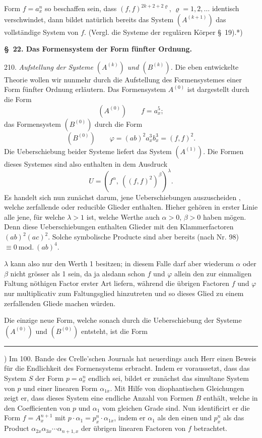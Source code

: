 Form $f = a_x^n$ so beschaffen sein, dass $(f,f)^{2k+2+2\varrho}$, $\varrho = 1, 2, \ldots$
identisch verschwindet, dann bildet natürlich bereits das System
$(A^{(k+1)})$ das vollständige System von $f$. (Vergl. die Systeme der
regulären Körper \S\ 19).*)

\begin{center}
\textbf{\S\ 22. Das Formensystem der Form fünfter Ordnung.}
\end{center}

210. \textit{Aufstellung der Systeme $(A^{(k)})$ und $(B^{(k)})$.} Die eben entwickelte
 Theorie wollen wir nunmehr durch die Aufstellung des Formensystemes
 einer Form fünfter Ordnung erläutern. Das Formensystem
$A^{(0)}$ ist dargestellt durch die Form
\[
(A^{(0)}) \qquad f = a_x^5;
\]
das Formensystem $(B^{(0)})$ durch die Form
\[
(B^{(0)}) \qquad \varphi = (ab)^2 a_x^3 b_x^3 = (f,f)^2.
\]
Die Ueberschiebung beider Systeme liefert das System $(A^{(1)})$. Die
Formen dieses Systemes sind also enthalten in dem Ausdruck
\[
U = \left(f^\alpha,\ ((f,f)^2)^\beta\right)^\lambda.
\]
Es handelt sich nun zunächst darum, jene Ueberschiebungen auszuscheiden
, welche zerfallende oder reducible Glieder enthalten. Hieher
gehören in erster Linie alle jene, für welche $\lambda > 1$ ist, welche Werthe
auch $\alpha > 0$, $\beta > 0$ haben mögen. Denn diese Ueberschiebungen enthalten
 Glieder mit den Klammerfactoren $(ab)^2 (ac)^2$. Solche symbolische
Producte sind aber bereits (nach Nr. 98) $\equiv 0\ \mathrm{mod.}\ (ab)^4$.

$\lambda$ kann also nur den Werth 1 besitzen; in diesem Falle darf aber
wiederum $\alpha$ oder $\beta$ nicht grösser als 1 sein, da ja alsdann schon $f$
und $\varphi$ allein den zur einmaligen Faltung nöthigen Factor erster
Art liefern, während die übrigen Factoren $f$ und $\varphi$ nur multiplicativ
zum Faltungsglied hinzutreten und so dieses Glied zu einem zerfallenden
 Gliede machen würden.

Die einzige neue Form, welche sonach durch die Ueberschiebung
der Systeme $(A^{(0)})$ und $(B^{(0)})$ entsteht, ist die Form

\bigskip
\noindent\rule{4cm}{0.4pt}

\noindent *) Im 100. Bande des Crelle'schen Journals hat neuerdings auch Herr
 einen Beweis für die Endlichkeit des Formensystems erbracht.
Indem er voraussetzt, dass das System $S$ der Form $p = a_x^n$ endlich
sei, bildet er zunächst das simultane System von $p$ und einer linearen
Form $\alpha_{1x}$. Mit Hilfe von diophantischen Gleichungen zeigt er, dass
dieses System eine endliche Anzahl von Formen $B$ enthält, welche
in den Coefficienten von $p$ und $\alpha_1$ vom gleichen Grade sind.
Nun identificirt er die Form $f = A_x^{n+1}$ mit $p \cdot \alpha_1 = p_x^n \cdot \alpha_{1x}$, indem
er $\alpha_1$ als den einen und $p_x^n$ als das Product $\alpha_{2x}\alpha_{3x}\cdots\alpha_{n+1,x}$ der
übrigen linearen Factoren von $f$ betrachtet.


